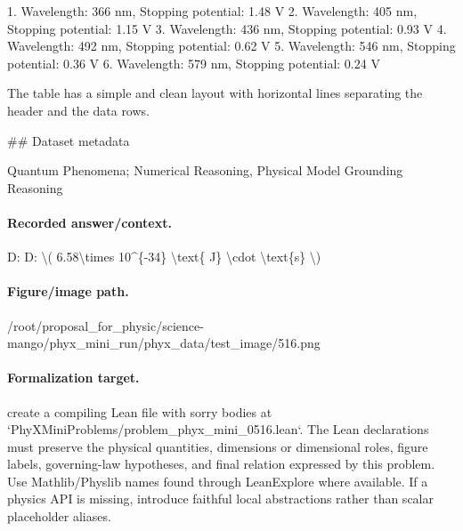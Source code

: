 1. Wavelength: 366 nm, Stopping potential: 1.48 V
2. Wavelength: 405 nm, Stopping potential: 1.15 V
3. Wavelength: 436 nm, Stopping potential: 0.93 V
4. Wavelength: 492 nm, Stopping potential: 0.62 V
5. Wavelength: 546 nm, Stopping potential: 0.36 V
6. Wavelength: 579 nm, Stopping potential: 0.24 V

The table has a simple and clean layout with horizontal lines separating the header and the data rows.

\#\# Dataset metadata

Quantum Phenomena; Numerical Reasoning, Physical Model Grounding Reasoning

\paragraph{Recorded answer/context.}
D: D: \textbackslash{}( 6.58\textbackslash{}times 10\textasciicircum{}\{-34\} \textbackslash{}text\{ J\} \textbackslash{}cdot \textbackslash{}text\{s\} \textbackslash{})

\paragraph{Figure/image path.}
/root/proposal\_for\_physic/science-mango/phyx\_mini\_run/phyx\_data/test\_image/516.png

\paragraph{Formalization target.}
create a compiling Lean file with sorry bodies at `PhyXMiniProblems/problem\_phyx\_mini\_0516.lean`. The Lean declarations must preserve the physical quantities, dimensions or dimensional roles, figure labels, governing-law hypotheses, and final relation expressed by this problem.
Use Mathlib/Physlib names found through LeanExplore where available. If a physics API is missing, introduce faithful local abstractions rather than scalar placeholder aliases.

